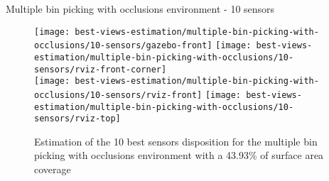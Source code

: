 \begin{frame}{Multiple bin picking with occlusions environment - 10 sensors}
	\begin{figure}
		\centering
		\texttt{[image: best-views-estimation/multiple-bin-picking-with-occlusions/10-sensors/gazebo-front]}\hspace{2em}
		\texttt{[image: best-views-estimation/multiple-bin-picking-with-occlusions/10-sensors/rviz-front-corner]}\\
		\texttt{[image: best-views-estimation/multiple-bin-picking-with-occlusions/10-sensors/rviz-front]}\hspace{1.5em}
		\texttt{[image: best-views-estimation/multiple-bin-picking-with-occlusions/10-sensors/rviz-top]}
		\caption{Estimation of the 10 best sensors disposition for the multiple bin picking with occlusions environment with a 43.93\% of surface area coverage}
	\end{figure}
\end{frame}
